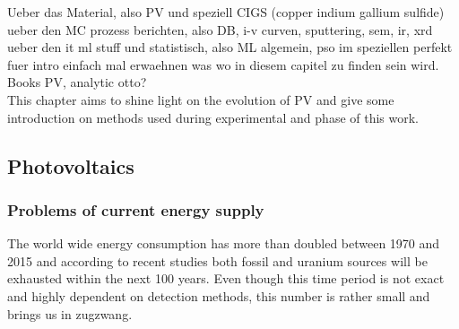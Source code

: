 Ueber das Material, also PV und speziell CIGS (copper indium gallium sulfide) 
ueber den MC prozess berichten, also DB, i-v curven, sputtering, sem, ir, xrd
ueber den it ml stuff und statistisch, also ML algemein, pso im speziellen 
perfekt fuer intro einfach mal erwaehnen was wo in diesem capitel zu finden sein wird. 
Books PV, analytic otto? 
\\
This chapter aims to shine light on the evolution of PV and 
give some introduction on methods used during experimental and  phase of this work. 
\subsection{Photovoltaics}
\iffalse
The grundlage for all pvs is the photovoltaik effect which was entdeckt by Albert Einstein adn for which he got the nobel price. 
The Prinziple is easy: When the energy (E = hv) of the light is \td{large,strong,high}er 
than the binding energy of an electron the electron is ejected with the remaining energy as kinetic energy 
\begin{math}
	E_{kin}=hv - Eb
\end{math}
Different Materials have different binding energies. 
Metals do have in general lower binding energies than covalent bound material and semiconductors do have even lowers E_b. Really? 
That's Silica is in a lot of PVs. 
The next generation of PVs. 
CIGS has in contrast to silicon based PV a direct band gap\td{source and what does that mean?}
duennschicht pv, haben eine effeftivitaet von 7-16\% vs 15-22\% \cite{Mertens2018}
\fi
\subsubsection{Problems of current energy supply}
The world wide energy consumption has more than doubled between 1970 and 2015\cite{BP2017} 
and according to recent studies both fossil\cite{BGR2017} and uranium sources\cite{Uran2006} 
will be exhausted within the next 100 years. 
Even though this time period is not exact and highly dependent on detection methods, 
this number is rather small and brings us in zugzwang. 

